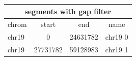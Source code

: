 \documentclass{standalone}
\begin{document}
\begin{tabular}{|l|c|c|c|}
\hline
\multicolumn{4}{|c|}{\textbf{segments with gap filter}}\\
\hline 

chrom & start & end & name \\
\hline
chr19 & 0 & 24631782 & chr19 0 \\
chr19 & 27731782 & 59128983 & chr19 1 \\
\hline
\end{tabular}
\end{document}
